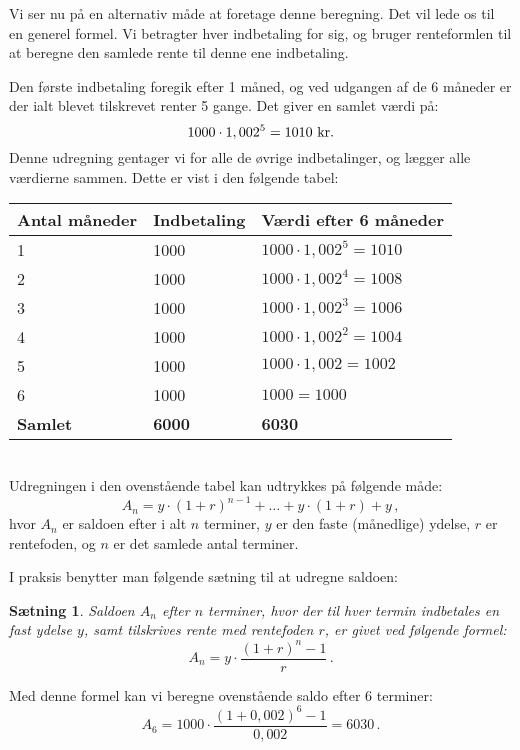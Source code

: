\documentclass[12pt,oneside,a4paper]{article}
\newtheorem{thm}{Sætning}[section]
\begin{document}
Vi ser nu på en alternativ måde at foretage denne beregning. Det vil lede os
til en generel formel. Vi betragter hver indbetaling for sig, og bruger
renteformlen til at beregne den samlede rente til denne ene indbetaling.

Den første indbetaling foregik efter 1 måned, og ved udgangen af de 6 måneder
er der ialt blevet tilskrevet renter 5 gange.  Det giver en samlet værdi på:
\[
    1000\cdot 1,002^5 = 1010 {\,\,\rm kr.}
\]
Denne udregning gentager vi for alle de øvrige indbetalinger, og lægger alle
værdierne sammen.  Dette er vist i den følgende tabel:
\\

\begin{tabular}{|l|l|l|}
    \hline
    \textbf{Antal måneder} & \textbf{Indbetaling} & \textbf{Værdi efter 6 måneder} \\
    \hline
    1 & 1000 & $1000 \cdot 1,002^5 = 1010$ \\
    \hline
    2 & 1000 & $1000 \cdot 1,002^4 = 1008$ \\
    \hline
    3 & 1000 & $1000 \cdot 1,002^3 = 1006$ \\
    \hline
    4 & 1000 & $1000 \cdot 1,002^2 = 1004$ \\
    \hline
    5 & 1000 & $1000 \cdot 1,002 = 1002$ \\
    \hline
    6 & 1000 & $1000 = 1000$ \\
    \hline
    \textbf{Samlet} & \textbf{6000} & \textbf{6030} \\
    \hline
\end{tabular}
\\

Udregningen i den ovenstående tabel kan udtrykkes på følgende måde:
\[
A_n = y\cdot(1+r)^{n-1} + \ldots + y\cdot(1+r) + y \,,
\]
hvor $A_n$ er saldoen efter i alt $n$ terminer,  $y$ er den faste (månedlige)
ydelse, $r$ er rentefoden, og $n$ er det samlede antal terminer.

I praksis benytter man følgende sætning til at udregne saldoen:
\begin{tcolorbox}
\begin{thm}
Saldoen $A_n$ efter $n$ terminer, hvor der til hver termin indbetales en fast ydelse $y$,
samt tilskrives rente med rentefoden $r$, er givet ved følgende formel:
\[
A_n = y\cdot\frac{(1+r)^n-1}{r}\,.
\]
\end{thm}
\end{tcolorbox}

Med denne formel kan vi beregne ovenstående saldo efter 6 terminer:
\[
A_6 = 1000\cdot\frac{(1+0,002)^6-1}{0,002} = 6030 \,.
\]
\end{document}
